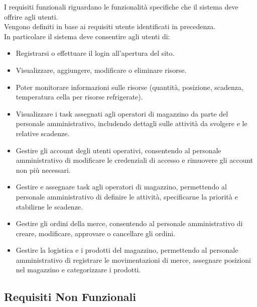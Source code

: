 I requisiti funzionali riguardano le funzionalità specifiche che il sistema
deve offrire agli utenti.\\ Vengono definiti in base ai requisiti utente identificati in precedenza.\\
In particolare il sistema deve consentire agli utenti di:
\begin{itemize}
    \item Registrarsi o effettuare il login all’apertura del sito.
    \item Visualizzare, aggiungere, modificare o eliminare risorse.
    \item Poter monitorare informazioni sulle risorse (quantità, posizione, scadenza, temperatura cella per risorse refrigerate).
    \item Visualizzare i task assegnati agli operatori di magazzino da parte del personale amministrativo, includendo dettagli sulle attività da svolgere e le relative scadenze.
    \item Gestire gli account degli utenti operativi, consentendo al personale amministrativo di modificare le credenziali di accesso e rimuovere gli account non più necessari.
    \item Gestire e assegnare task agli operatori di magazzino, permettendo al personale amministrativo di definire le attività, specificarne la priorità e stabilirne le scadenze.
    \item Gestire gli ordini della merce, consentendo al personale amministrativo di creare, modificare, approvare o cancellare gli ordini.
    \item Gestire la logistica e i prodotti del magazzino, permettendo al personale amministrativo di registrare le movimentazioni di merce, assegnare posizioni nel magazzino e categorizzare i prodotti.
\end{itemize}

\subsection{Requisiti Non Funzionali}

